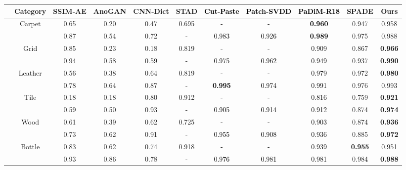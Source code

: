 \documentclass{bmvc2k}
\newcommand{\wgd}[1]{\textcolor{black}{{}#1}}
\begin{document}
\begin{table*}[!t]
	\centering
	\begin{adjustbox}{width=0.95\textwidth}
	\begin{threeparttable}
		\begin{tabular}{c|c|c c c c c c c c c}
			\hline
			& Category   & SSIM-AE & AnoGAN & CNN-Dict & STAD & \wgd{Cut-Paste}    & \wgd{Patch-SVDD} & \wgd{PaDiM-R18} & SPADE  &  Ours\\  \hline
			\multirow{10}{*}{\rotatebox{90}{Textures}} 
			&\multirow{2}{*}{Carpet}  & 0.65  & 0.20  & 0.47  & 0.695 & \wgd{-}     & \wgd{-}     & \wgd{\textbf{0.960}} & 0.947 & 0.958 \\ 
			                     &    & 0.87  & 0.54  & 0.72  & -     & \wgd{0.983} & \wgd{0.926} & \wgd{\textbf{0.989}} & 0.975 & 0.988 \\ \cline{2-11} 
			&\multirow{2}{*}{Grid}    & 0.85  & 0.23  & 0.18  & 0.819 & \wgd{-}     & \wgd{-}     & \wgd{0.909} & 0.867 & \textbf{0.966} \\
			                     &    & 0.94  & 0.58  & 0.59  & -     & \wgd{0.975} & \wgd{0.962} & \wgd{0.949} & 0.937 & \textbf{0.990} \\ \cline{2-11} 
			&\multirow{2}{*}{Leather} & 0.56  & 0.38  & 0.64  & 0.819 & \wgd{-}     & \wgd{-}     & \wgd{0.979} & 0.972 & \textbf{0.980} \\
			                     &    & 0.78  & 0.64  & 0.87  & -     & \wgd{\textbf{0.995}} & \wgd{0.974} & \wgd{0.991} & 0.976 & 0.993 \\ \cline{2-11} 
			&\multirow{2}{*}{Tile}    & 0.18  & 0.18  & 0.80  & 0.912 & \wgd{-}     & \wgd{-}     & \wgd{0.816} & 0.759 & \textbf{0.921} \\
			                     &    & 0.59  & 0.50  & 0.93  & -     & \wgd{0.905} & \wgd{0.914} & \wgd{0.912} & 0.874 & \textbf{0.974} \\ \cline{2-11} 
			&\multirow{2}{*}{Wood}    & 0.61  & 0.39  & 0.62  & 0.725 & \wgd{-}     & \wgd{-}     & \wgd{0.903} & 0.874 & \textbf{0.936} \\ 
			                     &    & 0.73  & 0.62  & 0.91  & -     & \wgd{0.955} & \wgd{0.908} & \wgd{0.936} & 0.885 & \textbf{0.972} \\ \hline
			\multirow{20}{*}{\rotatebox{90}{Objects}}
			&\multirow{2}{*}{Bottle}  & 0.83  & 0.62  & 0.74  & 0.918 & \wgd{-}     & \wgd{ -}    & \wgd{0.939} & \textbf{0.955} & 0.951 \\
			                     &    & 0.93  & 0.86  & 0.78  & -     & \wgd{0.976} & \wgd{0.981} & \wgd{0.981} & 0.984 & \textbf{0.988} \\ \cline{2-11} 

\end{tabular}
\end{threeparttable}
\end{adjustbox}
\end{table*}
\end{document}
